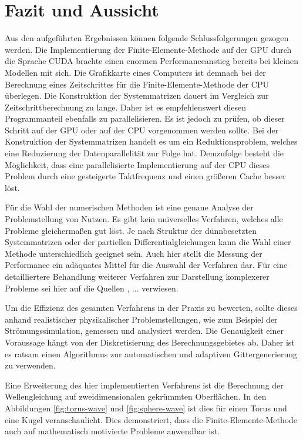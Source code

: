 \documentclass[crop=false]{standalone}
\begin{document}
  \section{Fazit und Aussicht} %
  \label{sec:conclusion}

    Aus den aufgeführten Ergebnissen können folgende Schlussfolgerungen gezogen werden.
    Die Implementierung der Finite-Elemente-Methode auf der GPU durch die Sprache CUDA brachte einen enormen Performanceanstieg bereits bei kleinen Modellen mit sich.
    Die Grafikkarte eines Computers ist demnach bei der Berechnung eines Zeitschrittes für die Finite-Elemente-Methode der CPU überlegen.
    Die Konstruktion der Systemmatrizen dauert im Vergleich zur Zeitschrittberechnung zu lange.
    Daher ist es empfehlenswert diesen Programmanteil ebenfalls zu parallelisieren.
    Es ist jedoch zu prüfen, ob dieser Schritt auf der GPU oder auf der CPU vorgenommen werden sollte.
    Bei der Konstruktion der Systemmatrizen handelt es um ein Reduktionsproblem, welches eine Reduzierung der Datenparallelität zur Folge hat.
    Demzufolge besteht die Möglichkeit, dass eine parallelisierte Implementierung auf der CPU dieses Problem durch eine gesteigerte Taktfrequenz und einen größeren Cache besser löst.

    Für die Wahl der numerischen Methoden ist eine genaue Analyse der Problemstellung von Nutzen.
    Es gibt kein universelles Verfahren, welches alle Probleme gleichermaßen gut löst.
    Je nach Struktur der dünnbesetzten Systemmatrizen oder der partiellen Differentialgleichungen kann die Wahl einer Methode unterschiedlich geeignet sein.
    Auch hier stellt die Messung der Performance ein adäquates Mittel für die Auswahl der Verfahren dar.
    Für eine detailliertere Behandlung weiterer Verfahren zur Darstellung komplexerer Probleme sei hier auf die Quellen \cite{Bell2008}, ... verwiesen.

    Um die Effizienz des gesamten Verfahrens in der Praxis zu bewerten, sollte dieses anhand realistischer physikalischer Problemstellungen, wie zum Beispiel der Strömungssimulation, gemessen und analysiert werden.
    Die Genauigkeit einer Voraussage hängt von der Diskretisierung des Berechnungsgebietes ab.
    Daher ist es ratsam einen Algorithmus zur automatischen und adaptiven Gittergenerierung zu verwenden.

    Eine Erweiterung des hier implementierten Verfahrens ist die Berechnung der Wellengleichung auf zweidimensionalen gekrümmten Oberflächen.
    In den Abbildungen \ref{fig:torus-wave} und \ref{fig:sphere-wave} ist dies für einen Torus und eine Kugel veranschaulicht.
    Dies demonstriert, dass die Finite-Elemente-Methode auch auf mathematisch motivierte Probleme anwendbar ist.
\end{document}
